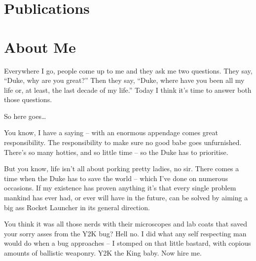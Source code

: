 \documentclass[letterpaper]{latex-cv}
\begin{document}
\begin{cvlist}
\end{cvlist}

\section{Publications}

\begin{cvlist}
\end{cvlist}

\section{About Me}

Everywhere I go, people come up to me and they ask me two questions. They say, “Duke, why are you great?”
Then they say, “Duke, where have you been all my life or, at least, the last decade of my life.” Today I
think it’s time to answer both those questions.

So here goes…

You know, I have a saying – with an enormous appendage comes great responsibility. The responsibility to
make sure no good babe goes unfurnished. There’s so many hotties, and so little time – so the Duke has to
prioritise.

But you know, life isn’t all about porking pretty ladies, no sir. There comes a time when the Duke has to
save the world – which I’ve done on numerous occasions. If my existence has proven anything it’s that every
single problem mankind has ever had, or ever will have in the future, can be solved by aiming a big ass
Rocket Launcher in its general direction.

You think it was all those nerds with their microscopes and lab coats that saved your sorry asses from the
Y2K bug? Hell no. I did what any self respecting man would do when a bug approaches – I stomped on that
little bastard, with copious amounts of ballistic weaponry. Y2K the King baby. Now hire me.
\end{document}
